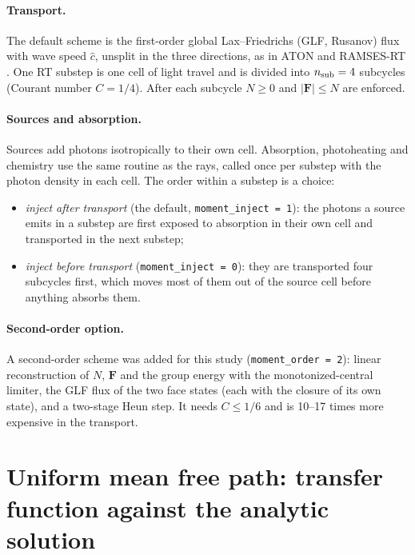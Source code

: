 \documentclass[11pt]{article}
\newcommand{\chat}{\hat{c}}
\begin{document}
\paragraph{Transport.} The default scheme is the first-order global Lax--Friedrichs (GLF, Rusanov) flux with
wave speed $\chat$, unsplit in the three directions, as in ATON and RAMSES-RT \citep{aubert08,rosdahl13}.
One RT substep is one cell of light travel and is divided into $n_{\rm sub}=4$ subcycles (Courant number
$C=1/4$). After each subcycle $N\ge0$ and $|\mathbf F|\le N$ are enforced.

\paragraph{Sources and absorption.} Sources add photons isotropically to their own cell. Absorption,
photoheating and chemistry use the same routine as the rays, called once per substep with the
photon density in each cell. The order within a substep is a choice:
\begin{itemize}
\item \emph{inject after transport} (the default, \texttt{moment\_inject = 1}): the photons a source emits
in a substep are first exposed to absorption in their own cell and transported in the next substep;
\item \emph{inject before transport} (\texttt{moment\_inject = 0}): they are transported four subcycles
first, which moves most of them out of the source cell before anything absorbs them.
\end{itemize}

\paragraph{Second-order option.} A second-order scheme was added for this study (\texttt{moment\_order = 2}):
linear reconstruction of $N$, $\mathbf F$ and the group energy with the monotonized-central limiter, the GLF
flux of the two face states (each with the closure of its own state), and a two-stage Heun step. It needs
$C\le1/6$ and is 10--17 times more expensive in the transport.

\section{Uniform mean free path: transfer function against the analytic solution}\label{sec:uniform}
\end{document}

